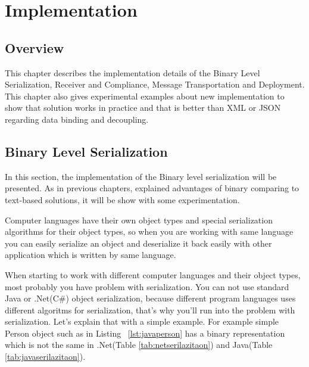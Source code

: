 

\chapter{Implementation}
\label{chapter:implementation}

\section{Overview}
\label{section:overview}

This chapter describes the implementation details of the Binary Level Serialization, Receiver and Compliance, Message Transportation and Deployment. This chapter also gives experimental examples about new implementation to show that solution works in practice and that is better than XML or JSON regarding data binding and decoupling.

\section{Binary Level Serialization}
\label{section:binaryLevelSerialization}

In this section, the implementation of the Binary level serialization will be presented. As in previous chapters, explained advantages of binary comparing to text-based solutions, it will be show with some experimentation.

Computer languages have their own object types and special serialization algorithms for their object types, so when you are working with same language you can easily serialize an object and deserialize it back easily with other application which is written by same language.

When starting to work with different computer languages and their object types, most probably you have problem with serialization. You can not use standard Java or .Net(C\#) object serialization, because different program languages uses different algoritms for serialization, that's why you’ll run into the problem with serialization. Let's explain that with a simple example. For example simple Person object such as in Listing ~\ref{lst:javaperson} has a binary representation which is not the same in .Net(Table \ref{tab:netserilazitaon}) and Java(Table \ref{tab:javaserilazitaon}).\\

